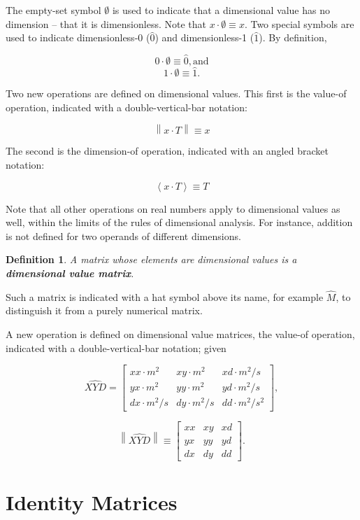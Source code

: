 \documentclass[10pt,letterpaper]{article}
\newtheorem{defn}{Definition}[section]
\numberwithin{equation}{section}
\begin{document}
The empty-set symbol $\emptyset$ is used to indicate that a dimensional value has no dimension – that it is dimensionless.  Note that $x \cdot \emptyset \equiv x$.  Two special symbols are used to indicate dimensionless-0 ($\hat 0$) and dimensionless-1 ($\hat 1$).  By definition,
 
 \[ 0 \cdot \emptyset \equiv \hat 0, \mbox{and} \]
 \[ 1 \cdot \emptyset \equiv \hat 1. \]

Two new operations are defined on dimensional values.  This first is the value-of operation, indicated with a double-vertical-bar notation:

\[ \left\| x \cdot T \right\| \equiv x \]

The second is the dimension-of operation, indicated with an angled bracket notation:

\[ \left\langle x \cdot T \right\rangle \equiv T \]

Note that all other operations on real numbers apply to dimensional values as well, within the limits of the rules of dimensional analysis.  For instance, addition is not defined for two operands of different dimensions.


\begin{defn}A matrix whose elements are dimensional values is a \textbf{dimensional value matrix}.\end{defn}
Such a matrix is indicated with a hat symbol above its name, for example $\hat M$, to distinguish it from a purely numerical matrix.

A new operation is defined on dimensional value matrices, the value-of operation, indicated with a double-vertical-bar notation; given

\[ \widehat{XYD} = \left[ \begin{matrix} 
  xx \cdot m^2 & xy \cdot m^2 & xd \cdot m^2/s \\
  yx \cdot m^2 & yy \cdot m^2 & yd \cdot m^2/s \\
  dx \cdot m^2/s & dy \cdot m^2/s & dd \cdot m^2/s^2
 \end{matrix} \right], \]
 
 \[ \left\| \widehat{XYD} \right\| \equiv \left[ \begin{matrix} 
  xx & xy & xd \\
  yx & yy & yd \\
  dx & dy & dd
 \end{matrix} \right]. \]
 
\section{Identity Matrices}
\end{document}
